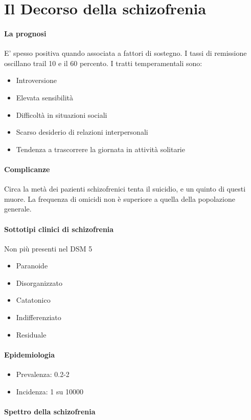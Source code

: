 
\section{Il Decorso della schizofrenia}

\paragraph{La prognosi} E' spesso positiva quando associata a fattori di sostegno. I tassi di remissione oscillano trail 10 e il 60 percento. I tratti temperamentali sono: 
\begin{itemize}
	\item Introversione 
	\item Elevata sensibilità
	\item Difficoltà in situazioni sociali
	\item Scarso desiderio di relazioni interpersonali
	\item Tendenza a trascorrere la giornata in attività solitarie
\end{itemize}

\paragraph{Complicanze}  Circa la metà dei pazienti schizofrenici tenta il suicidio, e un quinto di questi muore. La frequenza di omicidi non è superiore a quella della popolazione generale.
\paragraph{Sottotipi clinici di schizofrenia}  Non più presenti nel DSM 5
\begin{itemize}
	\item Paranoide
	\item Disorganizzato
	\item Catatonico
	\item Indifferenziato
	\item Residuale
\end{itemize}
\paragraph{Epidemiologia}  
\begin{itemize}
	\item Prevalenza: 0.2-2
	\item Incidenza: 1 su 10000
\end{itemize}
\paragraph{Spettro della schizofrenia}  


